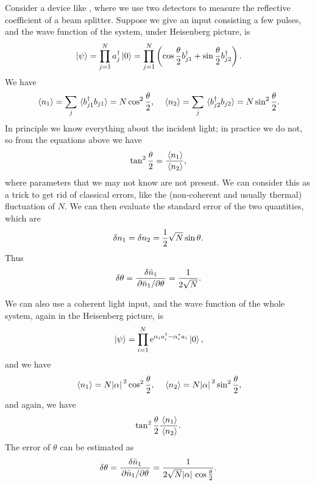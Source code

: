 \documentclass[hyperref, a4paper]{article}
\newcommand*{\ee}{\mathrm{e}}
\begin{document}
Consider a device like , where we use two detectors to measure the reflective coefficient of a beam splitter.
Suppose we give an input consisting a few pulses, and the wave function of the system, under Heisenberg picture, is
\begin{equation}
    \ket*{\psi} = \prod_{j=1}^N a_j^\dagger \ket*{0} = \prod_{j=1}^N \left( \cos\frac{\theta}{2} b_{j1}^\dagger + \sin\frac{\theta}{2} b_{j2}^\dagger \right) .
\end{equation}
We have 
\begin{equation}
    \expval*{n_1} = \sum_j \expval*{b_{j1}^\dagger b_{j1}} = N \cos^2\frac{\theta}{2}, \quad \expval*{n_2} = \sum_j \expval*{b_{j2}^\dagger b_{j2}} = N \sin^2\frac{\theta}{2}.
\end{equation}
In principle we know everything about the incident light; in practice we do not, so from the equations above we have 
\begin{equation}
    \tan^2 \frac{\theta}{2} = \frac{\expval*{n_1}}{\expval*{n_2}},
\end{equation}
where parameters that we may not know are not present.
We can consider this as a trick to get rid of classical errors, like the (non-coherent and usually thermal) fluctuation of $N$.
We can then evaluate the standard error of the two quantities, which are 
\begin{equation}
    \var{n}_1 = \var{n_2} = \frac{1}{2} \sqrt{N} \sin \theta.
\end{equation}
Thus 
\begin{equation}
    \var{\theta} = \frac{\var{\bar{n}}_1}{\pdv*{\bar{n}_1}{\theta}} = \frac{1}{2 \sqrt{N}}.
    \label{eq:particle-input-theta-error}
\end{equation}

We can also use a coherent light input, and the wave function of the whole system, again in the Heisenberg picture, is 
\begin{equation}
    \ket*{\psi} = \prod_{i=1}^N \ee^{\alpha_i a^\dagger_i - \alpha_i^* a_i} \ket*{0},
\end{equation}
and we have 
\begin{equation}
    \expval*{n_1} = N \abs*{\alpha}^2 \cos^2 \frac{\theta}{2}, \quad \expval*{n_2} = N \abs*{\alpha}^2 \sin^2 \frac{\theta}{2},
\end{equation}
and again, we have 
\begin{equation}
    \tan^2 \frac{\theta}{2} \frac{\expval*{n_1}}{\expval*{n_2}}.
\end{equation}
The error of $\theta$ can be estimated as 
\begin{equation}
    \var{\theta} = \frac{\var{\bar{n}}_1}{\pdv*{\bar{n}_1}{\theta}} = \frac{1}{2 \sqrt{N} \abs*{\alpha} \cos \frac{\theta}{2}}.
    \label{eq:coherent-input-theta-error}
\end{equation}
\end{document}
